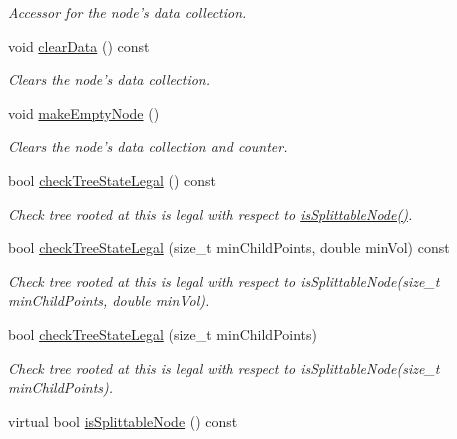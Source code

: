 \begin{DoxyCompactItemize}
\begin{DoxyCompactList}\small\item\em \-Accessor for the node's data collection. \end{DoxyCompactList}\item 
void \hyperlink{classsubpavings_1_1SPSnode_aa4b207c66d28113dc641d7cddf691547}{clear\-Data} () const 
\begin{DoxyCompactList}\small\item\em \-Clears the node's data collection. \end{DoxyCompactList}\item 
void \hyperlink{classsubpavings_1_1SPSnode_a69cbe84e4c59cd1369d3900d3ff05a01}{make\-Empty\-Node} ()
\begin{DoxyCompactList}\small\item\em \-Clears the node's data collection and counter. \end{DoxyCompactList}\item 
bool \hyperlink{classsubpavings_1_1SPSnode_a7cf5893a0c2bcfe03caf2865203e6678}{check\-Tree\-State\-Legal} () const 
\begin{DoxyCompactList}\small\item\em \-Check tree rooted at this is legal with respect to \hyperlink{classsubpavings_1_1SPSnode_afcaf3b298a975017982e88a068bab8af}{is\-Splittable\-Node()}. \end{DoxyCompactList}\item 
bool \hyperlink{classsubpavings_1_1SPSnode_a48e85710afe1e6b7f4d63afa891d4e38}{check\-Tree\-State\-Legal} (size\-\_\-t min\-Child\-Points, double min\-Vol) const 
\begin{DoxyCompactList}\small\item\em \-Check tree rooted at this is legal with respect to is\-Splittable\-Node(size\-\_\-t min\-Child\-Points, double min\-Vol). \end{DoxyCompactList}\item 
bool \hyperlink{classsubpavings_1_1SPSnode_ae6a71f8266d023f98489dafcc56d3819}{check\-Tree\-State\-Legal} (size\-\_\-t min\-Child\-Points)
\begin{DoxyCompactList}\small\item\em \-Check tree rooted at this is legal with respect to is\-Splittable\-Node(size\-\_\-t min\-Child\-Points). \end{DoxyCompactList}\item 
virtual bool \hyperlink{classsubpavings_1_1SPSnode_afcaf3b298a975017982e88a068bab8af}{is\-Splittable\-Node} () const 

\end{DoxyCompactItemize}
